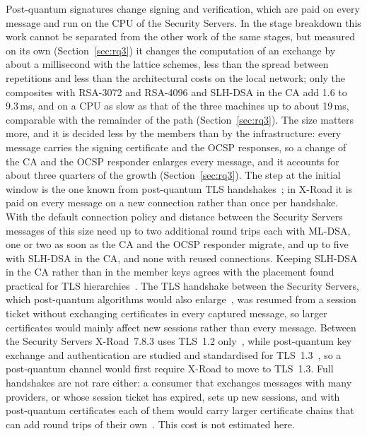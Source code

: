 \documentclass[conference,a4paper]{IEEEtran}
\newcommand{\newtext}[1]{{\color{blue}#1}}
\begin{document}
\newtext{Post-quantum signatures change signing and verification, which are paid on every message
and run on the CPU of the Security Servers. In the stage breakdown this work cannot be separated from
the other work of the same stages, but measured on its own (Section~\ref{sec:rq3}) it changes the
computation of an exchange by about a millisecond with the lattice schemes, less than the spread
between repetitions and less than the architectural costs on the local network; only the composites
with RSA-3072 and RSA-4096 and SLH-DSA in the CA add 1.6 to 9.3\,ms\newtext{, and on a CPU as slow
as that of the three machines up to about 19\,ms, comparable with the remainder of the path
(Section~\ref{sec:rq3})}. The size matters more, and it is
decided less by the members than by the infrastructure: every message carries the signing
certificate and the OCSP responses, so a change of the CA and the OCSP responder enlarges every
message, and it accounts for about three quarters of the growth (\newtext{Section~\ref{sec:rq3}}). The step at
the initial window is the one known from post-quantum TLS
handshakes~\cite{sikeridis2020,westerbaan2021,chou2026}; in X-Road it is paid on every message on a
new connection rather than once per handshake. With the default connection policy and distance
between the Security Servers messages of this size need up to two additional round trips each with
ML-DSA, one or two as soon as the CA and the OCSP responder migrate, and up to five with SLH-DSA in the CA, and none with reused connections. Keeping SLH-DSA in
the CA rather than in the member keys agrees with the placement found practical for TLS
hierarchies~\cite{delgado2026}.} The TLS handshake between the Security
Servers, which post-quantum algorithms would also enlarge~\cite{bakhtina2026pqc}, was resumed from a
session ticket without exchanging certificates in every captured message, so larger certificates would
mainly affect new sessions rather than every message. \newtext{Between the Security Servers
X-Road~7.8.3 uses TLS~1.2 only~\cite{xroadsrc}, while post-quantum key exchange and authentication
are studied and standardised for TLS~1.3~\cite{paquin2020,sikeridis2020}, so a post-quantum channel
would first require X-Road to move to TLS~1.3. Full handshakes are not rare either: a consumer that
exchanges messages with many providers, or whose session ticket has expired, sets up new sessions,
and with post-quantum certificates each of them would carry larger certificate chains that can add
round trips of their own~\cite{sikeridis2020}. This cost is not estimated here.}
\end{document}
